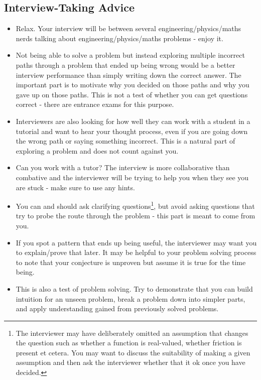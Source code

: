 \subsection{Interview-Taking Advice}

\begin{itemize}
	\item Relax. Your interview will be between several engineering/physics/maths nerds talking about engineering/physics/maths problems - enjoy it.
	\item Not being able to solve a problem but instead exploring multiple incorrect paths through a problem that ended up being wrong would be a better interview performance than simply writing down the correct answer. The important part is to motivate why you decided on those paths and why you gave up on those paths. This is not a test of whether you can get questions correct - there are entrance exams for this purpose.
	\item Interviewers are also looking for how well they can work with a student in a tutorial and want to hear your thought process, even if you are going down the wrong path or saying something incorrect. This is a natural part of exploring a problem and does not count against you.
	\item Can you work with a tutor? The interview is more collaborative than combative and the interviewer will be trying to help you when they see you are stuck - make sure to use any hints.
	\item You can and should ask clarifying questions\footnote{The interviewer may have deliberately omitted an assumption that changes the question such as whether a function is real-valued, whether friction is present et cetera. You may want to discuss the suitability of making a given assumption and then ask the interviewer whether that it ok once you have decided.}, but avoid asking questions that try to probe the route through the problem - this part is meant to come from you.
	\item If you spot a pattern that ends up being useful, the interviewer may want you to explain/prove that later. It may be helpful to your problem solving process to note that your conjecture is unproven but assume it is true for the time being.
	\item This is also a test of problem solving. Try to demonstrate that you can build intuition for an unseen problem, break a problem down into simpler parts, and apply understanding gained from previously solved problems.
\end{itemize}

